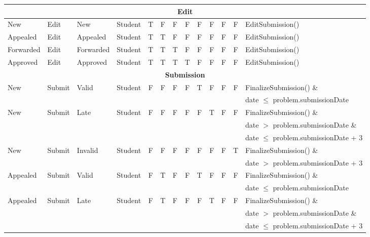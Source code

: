 \documentclass{article}
\begin{document}
\begin{enumerate}
\begin{center}
\begin{scriptsize}
\begin{tabular}{|l|l|l|l|c|c|c|c|c|c|c|c|p{4cm}|}
\multicolumn{13}{|c|}{\bf Edit} \\ \hline
\textsf{New}		& Edit	 	& \textsf{New} 		& Student	& T & F & F & F & F & F & F & F & EditSubmission() \\ \hline
\textsf{Appealed} 	& Edit	 	& \textsf{Appealed} & Student	& T & T & F & F & F & F & F & F & EditSubmission() \\ \hline
\textsf{Forwarded} 	& Edit 	& \textsf{Forwarded}& Student 	& T & T & T & F & F & F & F & F & EditSubmission() \\ \hline
\textsf{Approved} 	& Edit 	& \textsf{Approved} & Student	& T & T & T & T & F & F & F & F & EditSubmission() \\ \hline

\multicolumn{13}{|c|}{\bf Submission} \\ \hline
\textsf{New}		& Submit	 & \textsf{Valid} & Student	& F	& F & F & F & T & F & F & F & FinalizeSubmission() \& \\ 
&&&&&&&&&&&& \textsf{date} $\leq$ \textsf{problem.submissionDate} \\ \hline

\textsf{New}		& Submit	 & \textsf{Late} & Student	& F	& F & F & F & F & T & F & F & FinalizeSubmission() \& \\
&&&&&&&&&&&& \textsf{date} $>$ \textsf{problem.submissionDate} \& \\ 
&&&&&&&&&&&& \textsf{date} $\leq$ \textsf{problem.submissionDate} + 3 \\ \hline

\textsf{New}		& Submit	 & \textsf{Invalid} & Student	& F	& F & F & F & F & F & F & T & FinalizeSubmission() \& \\
&&&&&&&&&&&& \textsf{date} $>$ \textsf{problem.submissionDate} + 3 \\ \hline

\textsf{Appealed}		& Submit	 & \textsf{Valid} & Student	& F	& T & F & F & T & F & F & F & FinalizeSubmission() \& \\ 
&&&&&&&&&&&& \textsf{date} $\leq$ \textsf{problem.submissionDate} \\ \hline

\textsf{Appealed}		& Submit	 & \textsf{Late} & Student	& F	& T & F & F & F & T & F & F & FinalizeSubmission() \& \\
&&&&&&&&&&&& \textsf{date} $>$ \textsf{problem.submissionDate} \& \\ 
&&&&&&&&&&&& \textsf{date} $\leq$ \textsf{problem.submissionDate} + 3 \\ \hline


\end{tabular}
\end{scriptsize}
\end{center}
\end{enumerate}
\end{document}
